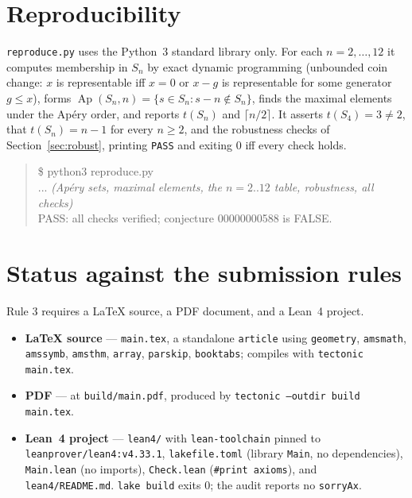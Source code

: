 \documentclass[11pt]{article}
\theoremstyle{definition}
\theoremstyle{remark}
\newcommand{\Ap}{\operatorname{Ap}}
\begin{document}
\section{Reproducibility}\label{sec:repro}

\texttt{reproduce.py} uses the Python~3 standard library only. For each
$n = 2, \dots, 12$ it computes membership in $S_n$ by exact dynamic
programming (unbounded coin change: $x$ is representable iff $x = 0$ or
$x - g$ is representable for some generator $g \le x$), forms
$\Ap(S_n,n) = \{s \in S_n : s - n \notin S_n\}$, finds the maximal elements
under the Apéry order, and reports $t(S_n)$ and $\lceil n/2 \rceil$. It asserts
$t(S_4) = 3 \ne 2$, that $t(S_n) = n-1$ for every $n \ge 2$, and the robustness
checks of Section~\ref{sec:robust}, printing \texttt{PASS} and exiting $0$ iff
every check holds.

\begin{quote}\ttfamily\small
\$ python3 reproduce.py\\
... \textit{(Apéry sets, maximal elements, the $n = 2..12$ table,
robustness, all checks)}\\
PASS: all checks verified; conjecture 00000000588 is FALSE.
\end{quote}

\section*{Status against the submission rules}

Rule 3 requires a LaTeX source, a PDF document, and a Lean~4 project.

\begin{itemize}\sloppy
\item \textbf{LaTeX source} --- \texttt{main.tex}, a standalone \texttt{article}
  using \texttt{geometry}, \texttt{amsmath}, \texttt{amssymb}, \texttt{amsthm},
  \texttt{array}, \texttt{parskip}, \texttt{booktabs}; compiles with
  \texttt{tectonic main.tex}.
\item \textbf{PDF} --- at \texttt{build/main.pdf}, produced by
  \texttt{tectonic --outdir build main.tex}.
\item \textbf{Lean~4 project} --- \texttt{lean4/} with \texttt{lean-toolchain}
  pinned to \texttt{leanprover/lean4:v4.33.1}, \texttt{lakefile.toml}
  (library \texttt{Main}, no dependencies), \texttt{Main.lean} (no imports),
  \texttt{Check.lean} (\texttt{\#print axioms}), and \texttt{lean4/README.md}.
  \texttt{lake build} exits $0$; the audit reports no \texttt{sorryAx}.
\end{itemize}
\end{document}
